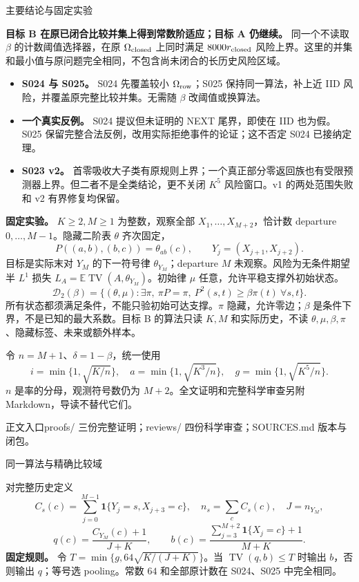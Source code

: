 \documentclass[11pt,a4paper]{article}
\newcommand{\TV}{\operatorname{TV}}\newcommand{\E}{\mathbb E}\newcommand{\Prob}{\mathbb P}
\newcommand{\head}[2]{{\small\sffamily #1}\par\vspace{2pt}{\LARGE\bfseries #2}\par\vspace{5pt}}
\newcommand{\entry}[1]{\vfill{\noindent\small\raggedright 正文入口\quad #1\par}}
\begin{document}
\head{主要结论与固定实验}{未知条件适应的闭合与吸收结构边界}
\textbf{目标 B 在原已闭合比较并集上得到常数阶适应；目标 A 仍继续。} 同一个不读取 $\beta$ 的计数阈值选择器，在原 $\Omega_{\rm closed}$ 上同时满足 $8000r_{\rm closed}$ 风险上界。这里的并集和最小值与原问题完全相同，不包含尚未闭合的长历史风险区域。
\begin{itemize}
\item \textbf{S024 与 S025。} S024 先覆盖较小 $\Omega_{\rm row}$；S025 保持同一算法，补上近 IID 风险，并覆盖原完整比较并集。无需随 $\beta$ 改阈值或换算法。
\item \textbf{一个真实反例。} S024 提议但未证明的 NEXT 尾界，即使在 IID 也为假。S025 保留完整合法反例，改用实际拒绝事件的论证；这不否定 S024 已接纳定理。
\item \textbf{S023 v2。} 首零吸收大子类有原规则上界；一个真正部分零返回族也有受限预测器上界。但二者不是全类结论，更不关闭 $K^5$ 风险窗口。v1 的两处范围失败和 v2 有界修复均保留。
\end{itemize}
\textbf{固定实验。} $K\ge2,M\ge1$ 为整数，观察全部 $X_1,\ldots,X_{M+2}$，恰计数 departure $0,\ldots,M-1$。隐藏二阶表 $\theta$ 齐次固定，
\[
 P((a,b),(b,c))=\theta_{ab}(c),\qquad Y_j=(X_{j+1},X_{j+2}).
\]
目标是实际末对 $Y_M$ 的下一符号律 $\theta_{Y_M}$；departure $M$ 未观察。风险为无条件期望半 $L^1$ 损失 $L_A=\E\TV(A,\theta_{Y_M})$。初始律 $\mu$ 任意，允许平稳支撑外初始状态。
\[
\mathcal D_2(\beta)=\{(\theta,\mu):\exists\pi,\ \pi P=\pi,\ P^2(s,t)\ge\beta\pi(t)\ \forall s,t\}.
\]
所有状态都须满足条件，不能只验初始可达支撑。$\pi$ 隐藏，允许零边；$\beta$ 是条件下界，不是已知的最大系数。目标 B 的算法只读 $K,M$ 和实际历史，不读 $\theta,\mu,\beta,\pi$、隐藏标签、未来或额外样本。

令 $n=M+1$、$\delta=1-\beta$，统一使用
\[
 i=\min\{1,\sqrt{K/n}\},\quad a=\min\{1,\sqrt{K^3/n}\},\quad
 g=\min\{1,\sqrt{K^5/n}\}.
\]
$n$ 是率的分母，观测符号数仍为 $M+2$。全文证明和完整科学审查另附 Markdown，导读不替代它们。
\entry{proofs/ 三份完整证明；reviews/ 四份科学审查；SOURCES.md 版本与闭包。}
\newpage
\head{同一算法与精确比较域}{原比较并集上的常数阶适应}
对完整历史定义
\[
 C_s(c)=\sum_{j=0}^{M-1}\mathbf1\{Y_j=s,X_{j+3}=c\},\quad n_s=\sum_c C_s(c),\quad J=n_{Y_M},
\]
\[
 q(c)=\frac{C_{Y_M}(c)+1}{J+K},\qquad
 b(c)=\frac{\sum_{j=3}^{M+2}\mathbf1\{X_j=c\}+1}{M+K}.
\]
\textbf{固定规则。} 令 $T=\min\{g,64\sqrt{K/(J+K)}\}$。当 $\TV(q,b)\le T$ 时输出 $b$，否则输出 $q$；等号选 pooling。常数 $64$ 和全部原计数在 S024、S025 中完全相同。
\end{document}
